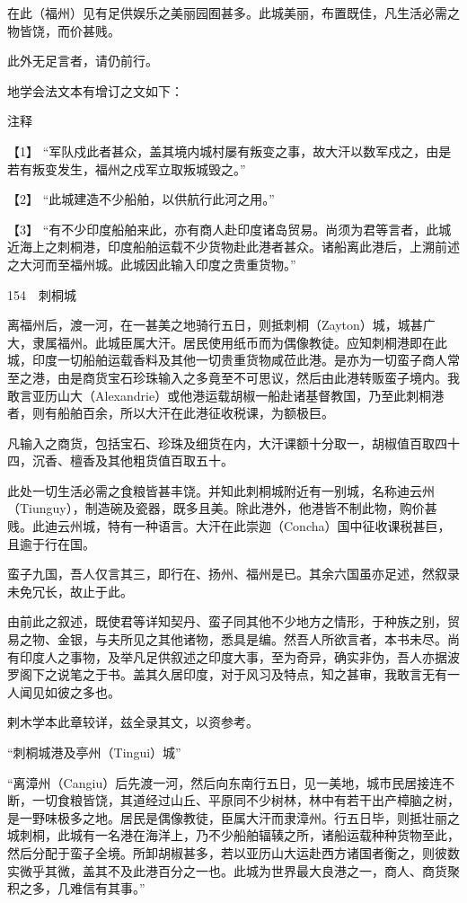 \documentclass[12pt,UTF8]{ctexbook}
\begin{document}
在此（福州）见有足供娱乐之美丽园囿甚多。此城美丽，布置既佳，凡生活必需之物皆饶，而价甚贱。

此外无足言者，请仍前行。

地学会法文本有增订之文如下：

注释

【1】 “军队戍此者甚众，盖其境内城村屡有叛变之事，故大汗以数军戍之，由是若有叛变发生，福州之戍军立取叛城毁之。”

【2】 “此城建造不少船舶，以供航行此河之用。”

【3】 “有不少印度船舶来此，亦有商人赴印度诸岛贸易。尚须为君等言者，此城近海上之刺桐港，印度船舶运载不少货物赴此港者甚众。诸船离此港后，上溯前述之大河而至福州城。此城因此输入印度之贵重货物。”





154　刺桐城

离福州后，渡一河，在一甚美之地骑行五日，则抵刺桐（Zayton）城，城甚广大，隶属福州。此城臣属大汗。居民使用纸币而为偶像教徒。应知刺桐港即在此城，印度一切船舶运载香料及其他一切贵重货物咸莅此港。是亦为一切蛮子商人常至之港，由是商货宝石珍珠输入之多竟至不可思议，然后由此港转贩蛮子境内。我敢言亚历山大（Alexandrie）或他港运载胡椒一船赴诸基督教国，乃至此刺桐港者，则有船舶百余，所以大汗在此港征收税课，为额极巨。

凡输入之商货，包括宝石、珍珠及细货在内，大汗课额十分取一，胡椒值百取四十四，沉香、檀香及其他粗货值百取五十。

此处一切生活必需之食粮皆甚丰饶。并知此刺桐城附近有一别城，名称迪云州（Tiunguy），制造碗及瓷器，既多且美。除此港外，他港皆不制此物，购价甚贱。此迪云州城，特有一种语言。大汗在此崇迦（Concha）国中征收课税甚巨，且逾于行在国。

蛮子九国，吾人仅言其三，即行在、扬州、福州是已。其余六国虽亦足述，然叙录未免冗长，故止于此。

由前此之叙述，既使君等详知契丹、蛮子同其他不少地方之情形，于种族之别，贸易之物、金银，与夫所见之其他诸物，悉具是编。然吾人所欲言者，本书未尽。尚有印度人之事物，及举凡足供叙述之印度大事，至为奇异，确实非伪，吾人亦据波罗阁下之说笔之于书。盖其久居印度，对于风习及特点，知之甚审，我敢言无有一人闻见如彼之多也。

剌木学本此章较详，兹全录其文，以资参考。

“刺桐城港及亭州（Tingui）城”

“离漳州（Cangiu）后先渡一河，然后向东南行五日，见一美地，城市民居接连不断，一切食粮皆饶，其道经过山丘、平原同不少树林，林中有若干出产樟脑之树，是一野味极多之地。居民是偶像教徒，臣属大汗而隶漳州。行五日毕，则抵壮丽之城刺桐，此城有一名港在海洋上，乃不少船舶辐辏之所，诸船运载种种货物至此，然后分配于蛮子全境。所卸胡椒甚多，若以亚历山大运赴西方诸国者衡之，则彼数实微乎其微，盖其不及此港百分之一也。此城为世界最大良港之一，商人、商货聚积之多，几难信有其事。”
\end{document}
